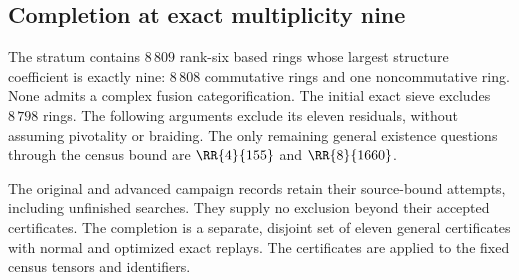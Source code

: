\subsection{Completion at exact multiplicity nine}
\label{sec:multiplicity-nine}
The stratum contains $8\,809$ rank-six based rings whose largest
structure coefficient is exactly nine: $8\,808$ commutative rings and one
noncommutative ring. None admits a complex fusion categorification.
The initial exact sieve excludes $8\,798$ rings. The following arguments
exclude its eleven residuals, without assuming pivotality or braiding.
The only remaining general existence questions through the census bound
are $\RR{4}{155}$ and $\RR{8}{1660}$.

The original and advanced campaign records retain their source-bound
attempts, including unfinished searches. They supply no exclusion beyond
their accepted certificates. The completion is a separate, disjoint set
of eleven general certificates with normal and optimized exact replays.
The certificates are applied to the fixed census tensors and identifiers.


